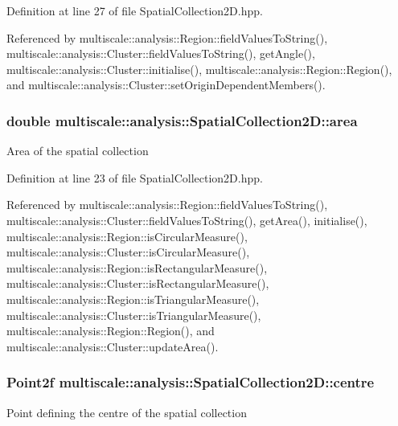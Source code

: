 Definition at line 27 of file Spatial\-Collection2\-D.\-hpp.



Referenced by multiscale\-::analysis\-::\-Region\-::field\-Values\-To\-String(), multiscale\-::analysis\-::\-Cluster\-::field\-Values\-To\-String(), get\-Angle(), multiscale\-::analysis\-::\-Cluster\-::initialise(), multiscale\-::analysis\-::\-Region\-::\-Region(), and multiscale\-::analysis\-::\-Cluster\-::set\-Origin\-Dependent\-Members().

\hypertarget{classmultiscale_1_1analysis_1_1SpatialCollection2D_ac570cc755e52aeb9deacf12d223a4a3a}{
\subsubsection[{area}]{\setlength{\rightskip}{0pt plus 5cm}double multiscale\-::analysis\-::\-Spatial\-Collection2\-D\-::area\hspace{0.3cm}{\ttfamily [protected]}}}\label{classmultiscale_1_1analysis_1_1SpatialCollection2D_ac570cc755e52aeb9deacf12d223a4a3a}
Area of the spatial collection 

Definition at line 23 of file Spatial\-Collection2\-D.\-hpp.



Referenced by multiscale\-::analysis\-::\-Region\-::field\-Values\-To\-String(), multiscale\-::analysis\-::\-Cluster\-::field\-Values\-To\-String(), get\-Area(), initialise(), multiscale\-::analysis\-::\-Region\-::is\-Circular\-Measure(), multiscale\-::analysis\-::\-Cluster\-::is\-Circular\-Measure(), multiscale\-::analysis\-::\-Region\-::is\-Rectangular\-Measure(), multiscale\-::analysis\-::\-Cluster\-::is\-Rectangular\-Measure(), multiscale\-::analysis\-::\-Region\-::is\-Triangular\-Measure(), multiscale\-::analysis\-::\-Cluster\-::is\-Triangular\-Measure(), multiscale\-::analysis\-::\-Region\-::\-Region(), and multiscale\-::analysis\-::\-Cluster\-::update\-Area().

\hypertarget{classmultiscale_1_1analysis_1_1SpatialCollection2D_afe9ef6b70ff53161cb02749444ae372c}{
\subsubsection[{centre}]{\setlength{\rightskip}{0pt plus 5cm}Point2f multiscale\-::analysis\-::\-Spatial\-Collection2\-D\-::centre\hspace{0.3cm}{\ttfamily [protected]}}}\label{classmultiscale_1_1analysis_1_1SpatialCollection2D_afe9ef6b70ff53161cb02749444ae372c}
Point defining the centre of the spatial collection 

